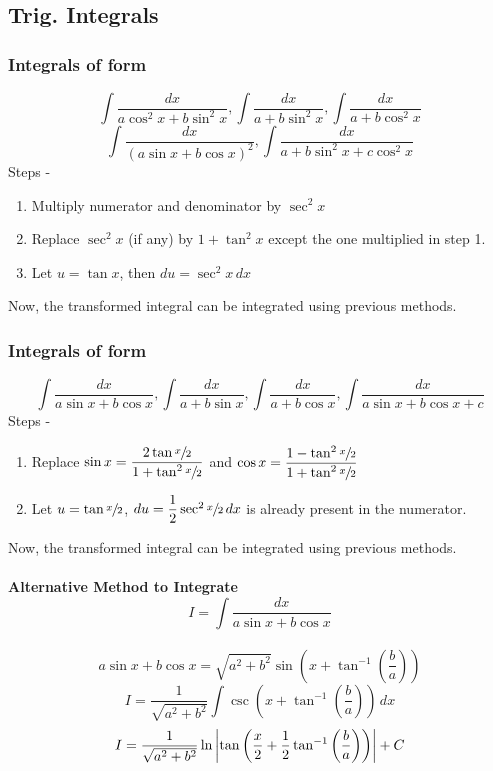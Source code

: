 \documentclass{article}
\begin{document}
\subsection{Trig. Integrals}
\subsubsection{Integrals of form}
$$\int \dfrac{dx}{a \cos^2 x+b\sin ^2 x}, \int \dfrac{dx}{a+b \sin^2 x}, \int \dfrac{dx}{a+b\cos^2 x}$$
$$\int \dfrac{dx}{\left(a\sin x+b\cos x\right)^2}, \int \dfrac{dx}{a+b\sin^2 x+c \cos ^2 x}$$
Steps -
\begin{enumerate}[1.]
    \item Multiply numerator and denominator by $\sec^2 x$
    \item Replace $\sec^2 x$ (if any) by $1+\tan^2 x$  except the one multiplied in step 1.
    \item Let $u=\tan x$, then $du=\sec^2 x \, dx$
\end{enumerate}
Now, the transformed integral can be integrated using previous methods.

\subsubsection{Integrals of form }
$$\int \dfrac{dx}{a\sin x +b \cos x}, \int \dfrac{dx}{a+b\sin x}, \int \dfrac{dx}{a+b\cos x}, \int \dfrac{dx}{a\sin x + b \cos x + c} $$
Steps -
\begin{enumerate}[1.]
    \item Replace $\sin x = \dfrac{2\tan \sfrac{x}{2}}{1+\tan^2 \sfrac{x}{2}}$ and $\cos x = \dfrac{1-\tan^2 \sfrac{x}{2}}{1+\tan^2 \sfrac{x}{2}}$
    \item Let $u=\tan \sfrac{x}{2}$, $du= \dfrac{1}{2} \sec^2 \sfrac{x}{2} \, dx$ is already present in the numerator.
\end{enumerate}
Now, the transformed integral can be integrated using previous methods.

\paragraph{Alternative Method to Integrate $$I=\int \dfrac{dx}{a\sin x + b \cos x}$$}

$$a\sin x + b \cos x = \sqrt{a^2+b^2} \sin (x+\tan^{-1} \left(\dfrac{b}{a}\right)) $$
$$I=\dfrac{1}{\sqrt{a^2+b^2}}\int \csc \left(x+ \tan^{-1}\left(\dfrac{b}{a}\right) \right) \, dx $$
$$I=\dfrac{1}{\sqrt{a^2+b^2}}\ln \abs{\tan \left(\dfrac{x}{2}+ \dfrac{1}{2} \tan^{-1} \left(\dfrac{b}{a}\right) \right)}+C$$
\end{document}
